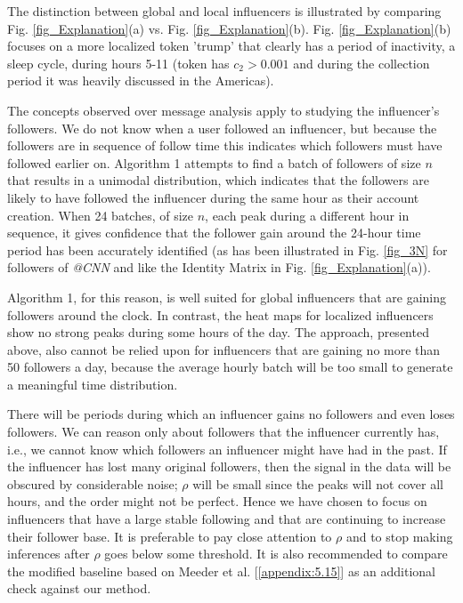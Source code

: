 The distinction between global and local influencers is illustrated by comparing Fig. \ref{fig_Explanation}(a) vs. Fig. \ref{fig_Explanation}(b). Fig. \ref{fig_Explanation}(b) focuses on a more localized token 'trump' that clearly has a period of inactivity, a sleep cycle, during hours 5-11 (token has $c_2 > 0.001$ and during the collection period it was heavily discussed in the Americas). 

The concepts observed over message analysis apply to studying the influencer's followers. We do not know when a user followed an influencer, but because the followers are in sequence of follow time this indicates which followers must have followed earlier on. Algorithm 1 attempts to find a batch of followers of size $n$ that results in a unimodal distribution, which indicates that the followers are likely to have followed the influencer during the same hour as their account creation. When 24 batches, of size $n$, each peak during a different hour in sequence, it gives confidence that the follower gain around the 24-hour time period has been accurately identified (as has been illustrated in Fig. \ref{fig_3N} for followers of \emph{@CNN} and like the Identity Matrix in Fig. \ref{fig_Explanation}(a)).

Algorithm 1, for this reason, is well suited for global influencers that are gaining followers around the clock. In contrast, the heat maps for localized influencers show no strong peaks during some hours of the day. The approach, presented above, also cannot be relied upon for influencers that are gaining no more than 50 followers a day, because the average hourly batch will be too small to generate a meaningful time distribution. 

There will be periods during which an influencer gains no followers and even loses followers. We can reason only about followers that the influencer currently has, i.e., we cannot know which followers an influencer might have had in the past. If the influencer has lost many original followers, then the signal in the data will be obscured by considerable noise; $\rho$ will be small since the peaks will not cover all hours, and the order might not be perfect. Hence we have chosen to focus on influencers that have a large stable following and that are continuing to increase their follower base. It is preferable to pay close attention to $\rho$ and to stop making inferences after $\rho$ goes below some threshold. It is also recommended to compare the modified baseline based on Meeder et al. [\ref{appendix:5.15}] as an additional check against our method.

